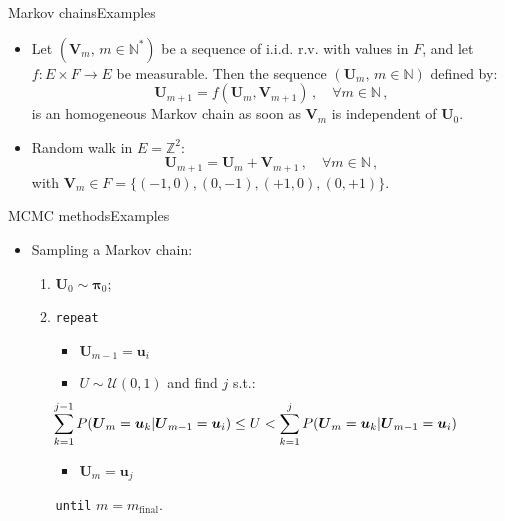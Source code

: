 \documentclass{beamer}
\newcommand{\Nset}{\mathbb{N}}
\newcommand{\Zset}{\mathbb{Z}}
\newcommand{\ugj}{u}
\newcommand{\ug}{{\boldsymbol\ugj}}
\newcommand{\Ugj}{U}
\newcommand{\Vgj}{V}
\newcommand{\Ug}{{\boldsymbol\Ugj}}
\newcommand{\Vg}{{\boldsymbol\Vgj}}
\newcommand{\PDFU}{{\mathcal U}}
\newcommand{\TKi}{{\boldsymbol\pi}}
\begin{document}
\begin{frame}{Markov chains}{Examples}

\begin{itemize}
\item Let $(\Vg_m,\,m\in\Nset^*)$ be a sequence of i.i.d. r.v. with values in $F$, and let $f:E\times F\rightarrow E$ be measurable. Then the sequence $(\Ug_m,\,m\in\Nset)$ defined by:
\begin{displaymath}
\Ug_{m+1}=f(\Ug_m,\Vg_{m+1})\,,\quad\forall m\in\Nset\,,
\end{displaymath}
is an homogeneous Markov chain as soon as $\Vg_m$ is independent of $\Ug_0$.
\item Random walk in $E=\Zset^2$:
\begin{displaymath}
\Ug_{m+1}=\Ug_m+\Vg_{m+1}\,,\quad\forall m\in\Nset\,,
\end{displaymath}
with $\Vg_m\in F=\{(-1,0),(0,-1),(+1,0),(0,+1)\}$.
\end{itemize}

\end{frame}

\begin{frame}{MCMC methods}{Examples}

\begin{itemize}
\item Sampling a Markov chain:
\begin{enumerate}
\item $\Ug_0\sim\TKi_0$;
\item \texttt{repeat}
\begin{itemize}
\item $\Ug_{m-1}=\ug_i$
\item $\Ugj\sim\PDFU(0,1)$ and find $j$ s.t.:
\begin{displaymath}
\hspace*{-2truecm}\sum_{k=1}^{j-1}P(\Ug_m=\ug_k|\Ug_{m-1}=\ug_i)\leq\Ugj<\sum_{k=1}^{j}P(\Ug_m=\ug_k|\Ug_{m-1}=\ug_i)
\end{displaymath}
\item  $\Ug_m=\ug_j$
\end{itemize}
\texttt{until} $m=m_\mathrm{final}$.
\end{enumerate}
\end{itemize}

\end{frame}
\end{document}
